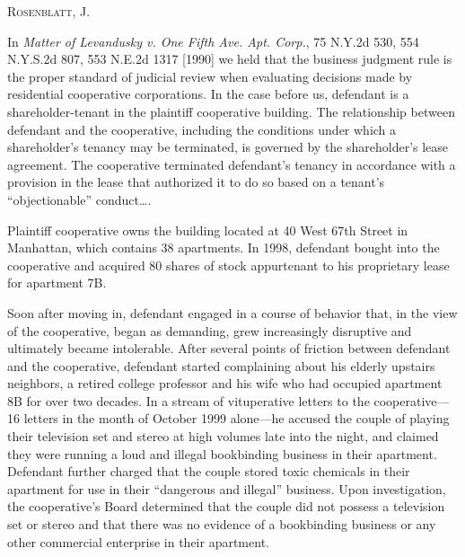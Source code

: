 

\opinion \textsc{Rosenblatt}, J.

In \textit{Matter of Levandusky v. One Fifth Ave. Apt. Corp.}, 75 N.Y.2d 530,
554 N.Y.S.2d 807, 553 N.E.2d 1317 [1990] we held that the business judgment rule
is the proper standard of judicial review when evaluating decisions made by
residential cooperative corporations. In the case before us, defendant is a
shareholder-tenant in the plaintiff cooperative building. The relationship
between defendant and the cooperative, including the conditions under which a
shareholder's tenancy may be terminated, is governed by the shareholder's lease
agreement. The cooperative terminated defendant's tenancy in accordance with a
provision in the lease that authorized it to do so based on a tenant's
``objectionable'' conduct\ldots .


Plaintiff cooperative owns the building located at 40 West 67th Street in
Manhattan, which contains 38 apartments. In 1998, defendant bought into the
cooperative and acquired 80 shares of stock appurtenant to his proprietary lease
for apartment 7B.

Soon after moving in, defendant engaged in a course of behavior that, in the
view of the cooperative, began as demanding, grew increasingly disruptive and
ultimately became intolerable. After several points of friction between
defendant and the cooperative, defendant started complaining about his elderly upstairs neighbors,
a retired college professor and his wife who had occupied apartment 8B for over
two decades. In a stream of vituperative letters to the cooperative---16 letters
in the month of October 1999 alone---he accused the couple of playing their
television set and stereo at high volumes late into the night, and claimed they
were running a loud and illegal bookbinding business in their apartment.
Defendant further charged that the couple stored toxic chemicals in their
apartment for use in their ``dangerous and illegal'' business. Upon
investigation, the cooperative's Board determined that the couple did not
possess a television set or stereo and that there was no evidence of a
bookbinding business or any other commercial enterprise in their apartment.

